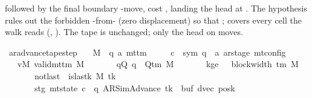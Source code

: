 \begin{isabellebody}
\begin{isamarkuptext}
   followed by the final boundary
  -move, cost , landing the head at
  .  The  hypothesis rules out the
  forbidden -from- (zero displacement) so that
  ;  covers every cell the walk reads
  (, ).  The tape is unchanged; only
  the head on  moves.%
\end{isamarkuptext}\isamarkuptrue%
\isamarkupfalse%
\ ar{\isacharunderscore}{\kern0pt}advance{\isacharunderscore}{\kern0pt}tape{\isacharunderscore}{\kern0pt}step{\isacharcolon}{\kern0pt}\isanewline
\ \ \ M\ {\isacharcolon}{\kern0pt}{\isacharcolon}{\kern0pt}\ {\isachardoublequoteopen}{\isacharparenleft}{\kern0pt}{\isacharprime}{\kern0pt}q{\isacharcomma}{\kern0pt}\ {\isacharprime}{\kern0pt}a{\isacharparenright}{\kern0pt}\ mttm{\isachardoublequoteclose}\isanewline
\ \ \ \ \ c{}\ {\isacharcolon}{\kern0pt}{\isacharcolon}{\kern0pt}\ {\isachardoublequoteopen}{\isacharparenleft}{\kern0pt}sym{}{\isacharcomma}{\kern0pt}\ {\isacharprime}{\kern0pt}q\ {\isasymtimes}\ {\isacharprime}{\kern0pt}a\ ar{\isacharunderscore}{\kern0pt}stage{\isacharparenright}{\kern0pt}\ mt{\isacharunderscore}{\kern0pt}config{\isachardoublequoteclose}\isanewline
\ \ \ vM{\isacharcolon}{\kern0pt}\ {\isachardoublequoteopen}valid{\isacharunderscore}{\kern0pt}mttm\ M{\isachardoublequoteclose}\isanewline
\ \ \ \ \ \ \ qQ{\isacharcolon}{\kern0pt}\ {\isachardoublequoteopen}q\ {\isasymin}\ Q{\isacharunderscore}{\kern0pt}tm\ M{\isachardoublequoteclose}\isanewline
\ \ \ \ \ \ \ kge{}{\isacharcolon}{\kern0pt}\ {\isachardoublequoteopen}{}\ {\isasymle}\ block{\isacharunderscore}{\kern0pt}width\ {\isacharparenleft}{\kern0pt}{\isasymGamma}{\isacharunderscore}{\kern0pt}tm\ M{\isacharparenright}{\kern0pt}{\isachardoublequoteclose}\isanewline
\ \ \ \ \ \ \ notlast{\isacharcolon}{\kern0pt}\ {\isachardoublequoteopen}{\isasymnot}\ is{\isacharunderscore}{\kern0pt}last{\isacharunderscore}{\kern0pt}k\ M\ tk{\isachardoublequoteclose}\isanewline
\ \ \ \ \ \ \ stg{\isacharcolon}{\kern0pt}\ {\isachardoublequoteopen}mt{\isacharunderscore}{\kern0pt}state\ c{}\ {\isacharequal}{\kern0pt}\ {\isacharparenleft}{\kern0pt}q{\isacharcomma}{\kern0pt}\ AR{\isacharunderscore}{\kern0pt}SimAdvance{\isacharcomma}{\kern0pt}\ tk{\isacharcomma}{\kern0pt}\ {}{\isacharcomma}{\kern0pt}\ buf{\isacharcomma}{\kern0pt}\ dvec{\isacharcomma}{\kern0pt}\ posk{\isacharparenright}{\kern0pt}{\isachardoublequoteclose}\isanewline

\end{isabellebody}
